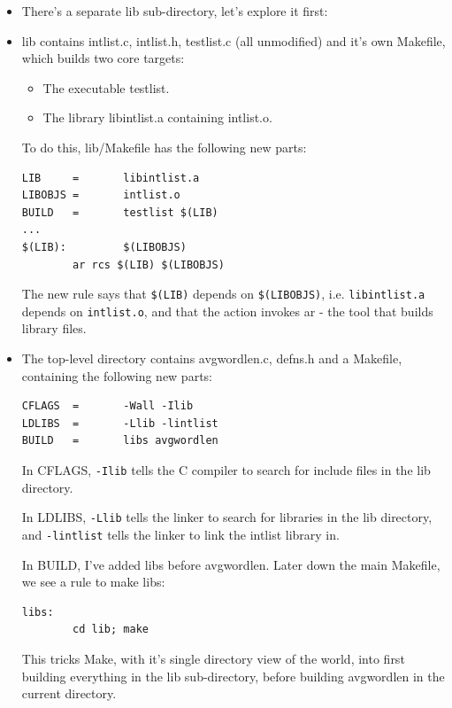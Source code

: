\documentclass[handout]{beamer}
\begin{document}
\begin{frame}[fragile]
\begin{itemize}
  \item
  There's a separate \alert{lib} sub-directory, let's explore it first:
  
  \item
  \alert{lib} contains \alert{intlist.c, intlist.h, testlist.c} (all unmodified) and it's own Makefile,
  \pause
  which builds two core targets:
  \begin{itemize}
    \item
    The executable \alert{testlist}.
    \item
    The library \alert{libintlist.a} containing \alert{intlist.o}.
  \end{itemize}
  \pitem
  To do this, \alert{lib/Makefile} has the following new parts:
\begin{verbatim}
LIB     =       libintlist.a
LIBOBJS =       intlist.o
BUILD   =       testlist $(LIB)
...
$(LIB):         $(LIBOBJS)
        ar rcs $(LIB) $(LIBOBJS)
\end{verbatim}


\pitem
The new rule says that \verb+$(LIB)+ depends on \verb+$(LIBOBJS)+,
i.e. \verb+libintlist.a+ depends on \verb+intlist.o+, and that the action invokes 
\alert{ar} - the tool that builds library files.

\end{itemize}
\end{frame}

\begin{frame}[fragile]
\begin{itemize}
\item
The top-level directory contains \alert{avgwordlen.c}, \alert{defns.h} and a Makefile,
\pause
containing the following new parts:
\begin{verbatim}
CFLAGS  =       -Wall -Ilib
LDLIBS  =       -Llib -lintlist
BUILD   =       libs avgwordlen
\end{verbatim}

\pitem
In CFLAGS, \verb+-Ilib+ tells the C compiler to search for include files in
the lib directory.

\pitem
In LDLIBS, \verb+-Llib+ tells the linker to search for libraries in the lib directory, and \verb+-lintlist+ tells the linker
to link the intlist library in.

\pitem
In BUILD, I've added \alert{libs} before \alert{avgwordlen}.
Later down the main Makefile, we see a rule to make \alert{libs}:
\begin{verbatim}
libs:
        cd lib; make
\end{verbatim}

\pitem
This tricks Make, with it's \alert{single directory} view of the world,
into first building everything in the lib sub-directory,
before building \alert{avgwordlen} in the current directory.

\end{itemize}
\end{frame}
\end{document}
